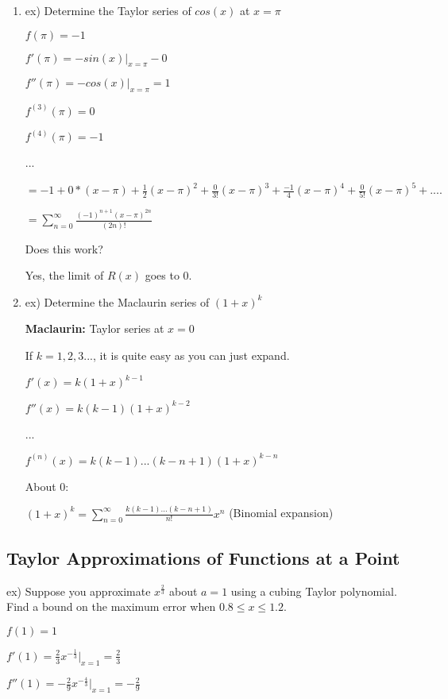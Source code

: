 \documentclass{article}
\begin{document}
\begin{enumerate}
    \item ex) Determine the Taylor series of $cos(x)$ at $x=\pi$
    
    $f(\pi) = -1$
    
    $f'(\pi) = -sin(x)|_{x=\pi} - 0$
    
    $f''(\pi) = -cos(x)|_{x=\pi} = 1$
    
    $f^{(3)}(\pi) = 0$
    
    $f^{(4)}(\pi) = -1$
    
    ...

    $= -1 + 0*(x-\pi) + \frac{1}{2}(x-\pi)^2 + \frac{0}{3!} (x-\pi)^3 + \frac{-1}{4} (x-\pi)^4 + \frac{0}{5!} (x-\pi)^5 + ....$
    
    $= \sum_{n=0}^{\infty} \frac{(-1)^{n+1} (x-\pi)^{2n}}{(2n)! }$
    
    Does this work?
    
    Yes, the limit of $R(x)$ goes to 0.
    
    \item ex) Determine the Maclaurin series of $(1+x)^k$
    
    \textbf{Maclaurin:} Taylor series at $x=0$
    
    If $k = 1, 2, 3...$, it is quite easy as you can just expand.
    
    $f'(x) = k(1+x)^{k-1}$
    
    $f''(x) = k(k-1)(1+x)^{k-2}$
    
    ...
    
    $f^{(n)}(x) = k(k-1)...(k-n+1)(1+x)^{k-n}$
    
    About 0:
    
    $(1+x)^k = \sum_{n=0}^{\infty} \frac{k(k-1)...(k-n+1)}{n!} x^n$ (Binomial expansion)
    
\end{enumerate}

\subsection{Taylor Approximations of Functions at a Point}

ex) Suppose you approximate $x^{\frac{2}{3}}$ about $a=1$ using a cubing Taylor polynomial. Find a bound on the maximum error when $0.8 \leq x \leq 1.2$.

$f(1) = 1$

$f'(1) = \frac{2}{3}x^{-\frac{1}{3}}|_{x=1} = \frac{2}{3} $ 

$f''(1) = -\frac{2}{9}x^{-\frac{4}{3}}|_{x=1} = -\frac{2}{9}$
\end{document}
